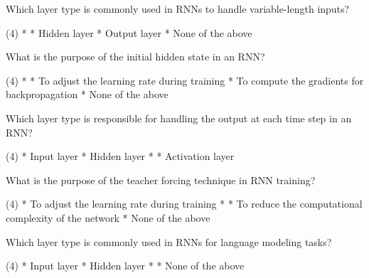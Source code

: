 \documentclass[10pt]{extarticle}
\begin{document}
\begin{exercise}
    Which layer type is commonly used in RNNs to handle variable-length inputs?
    \begin{choice} (4)
        * 
        * Hidden layer
        * Output layer
        * None of the above
    \end{choice}
\end{exercise}
\begin{solution}
\end{solution}

\begin{exercise}
    What is the purpose of the initial hidden state in an RNN?
    \begin{choice} (4)
        * 
        * To adjust the learning rate during training
        * To compute the gradients for backpropagation
        * None of the above
    \end{choice}
\end{exercise}
\begin{solution}
\end{solution}

\begin{exercise}
    Which layer type is responsible for handling the output at each time step in an RNN?
    \begin{choice} (4)
        * Input layer
        * Hidden layer
        * 
        * Activation layer
    \end{choice}
\end{exercise}
\begin{solution}
\end{solution}

\begin{exercise}
    What is the purpose of the teacher forcing technique in RNN training?
    \begin{choice} (4)
        * To adjust the learning rate during training
        * 
        * To reduce the computational complexity of the network
        * None of the above
    \end{choice}
\end{exercise}
\begin{solution}
\end{solution}

\begin{exercise}
    Which layer type is commonly used in RNNs for language modeling tasks?
    \begin{choice} (4)
        * Input layer
        * Hidden layer
        * 
        * None of the above
    \end{choice}
\end{exercise}
\begin{solution}
\end{solution}
\end{document}
